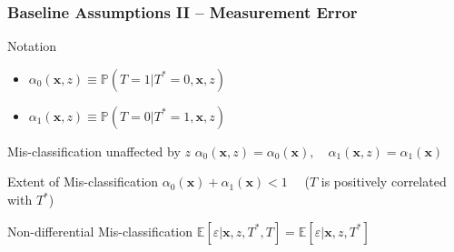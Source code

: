 \documentclass[handout]{beamer}
\begin{document}
\begin{frame}
  \frametitle{Baseline Assumptions II -- Measurement Error}


  \begin{alertblock}{Notation}
    \begin{itemize}
      \item $\alpha_0(\mathbf{x},z) \equiv \mathbb{P}\left(T=1|T^*=0,\mathbf{x},z  \right)$
  \item $\alpha_1(\mathbf{x},z) \equiv \mathbb{P}\left(T=0|T^*=1,\mathbf{x},z  \right)$
    \end{itemize}
  \end{alertblock}

  \begin{block}{Mis-classification unaffected by $z$}
    $\alpha_0(\mathbf{x},z) = \alpha_0(\mathbf{x}), \quad   \alpha_1(\mathbf{x},z) = \alpha_1(\mathbf{x})$
  \end{block}

  \begin{block}{Extent of Mis-classification}
      $\alpha_0(\mathbf{x}) + \alpha_1(\mathbf{x}) < 1 \quad$ ($T$ is positively correlated with $T^*$)
  \end{block}

  \begin{block}{Non-differential Mis-classification}
     $\mathbb{E}[\varepsilon|\mathbf{x},z,T^*,T] = \mathbb{E}[\varepsilon|\mathbf{x},z, T^*]$
  \end{block}



\end{frame}
\end{document}
